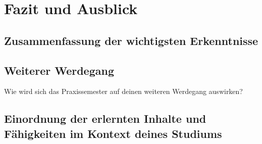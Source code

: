\chapter{Fazit und Ausblick}


\section{Zusammenfassung der wichtigsten Erkenntnisse}

\section{Weiterer Werdegang}
Wie wird sich das Praxissemester auf deinen weiteren Werdegang auswirken?

\section{Einordnung der erlernten Inhalte und Fähigkeiten im Kontext deines Studiums}